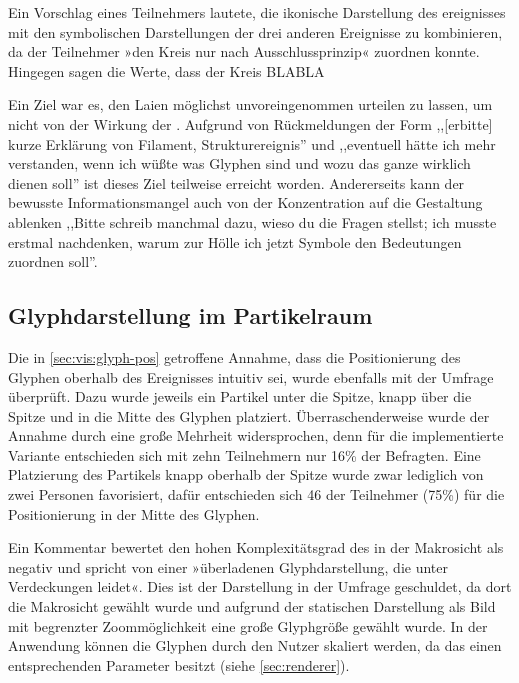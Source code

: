 

Ein Vorschlag eines Teilnehmers lautete, die ikonische Darstellung des ereignisses mit den symbolischen Darstellungen der drei anderen Ereignisse zu kombinieren, da der Teilnehmer »den Kreis nur nach Ausschlussprinzip« zuordnen konnte. Hingegen sagen die Werte, dass der Kreis BLABLA

Ein Ziel war es, den Laien möglichst unvoreingenommen urteilen zu lassen, um nicht von der Wirkung der . Aufgrund von Rückmeldungen der Form ,,[erbitte] kurze Erklärung von Filament, Strukturereignis'' und ,,eventuell hätte ich mehr verstanden, wenn ich wüßte was Glyphen sind und wozu das ganze wirklich dienen soll'' ist dieses Ziel teilweise erreicht worden. Andererseits kann der bewusste Informationsmangel auch von der Konzentration auf die Gestaltung ablenken ,,Bitte schreib manchmal dazu, wieso du die Fragen stellst; ich musste erstmal nachdenken, warum zur Hölle ich jetzt Symbole den Bedeutungen zuordnen soll''.


\subsection*{Glyphdarstellung im Partikelraum}\label{sec:eva:glyphdarstellung}

Die in \autoref{sec:vis:glyph-pos} getroffene Annahme, dass die Positionierung des Glyphen oberhalb des Ereignisses intuitiv sei, wurde ebenfalls mit der Umfrage überprüft. Dazu wurde jeweils ein Partikel unter die Spitze, knapp über die Spitze und in die Mitte des Glyphen platziert. Überraschenderweise wurde der Annahme durch eine große Mehrheit widersprochen, denn für die implementierte Variante entschieden sich mit zehn Teilnehmern nur 16\% der Befragten. Eine Platzierung des Partikels knapp oberhalb der Spitze wurde zwar lediglich von zwei Personen favorisiert, dafür entschieden sich 46 der Teilnehmer (75\%) für die Positionierung in der Mitte des Glyphen.

Ein Kommentar bewertet den hohen Komplexitätsgrad des  in der Makrosicht als negativ und spricht von einer »überladenen Glyphdarstellung, die unter Verdeckungen leidet«. Dies ist der Darstellung in der Umfrage geschuldet, da dort die Makrosicht gewählt wurde und aufgrund der statischen Darstellung als Bild mit begrenzter Zoommöglichkeit eine große Glyphgröße gewählt wurde. In der Anwendung können die Glyphen durch den Nutzer skaliert werden, da das  einen entsprechenden Parameter besitzt (siehe \autoref{sec:renderer}).


